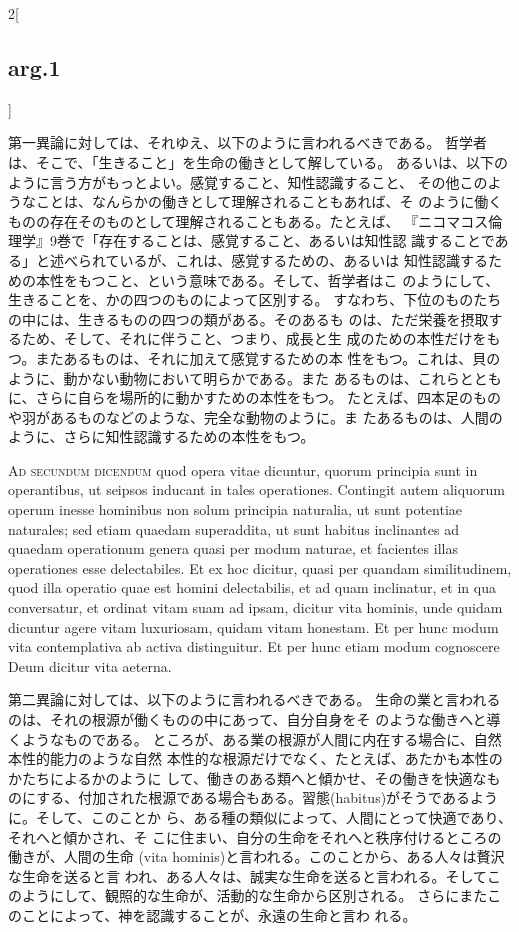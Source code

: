 \documentclass[paper=a4paper,fontsize=10pt,jafontsize=9pt,titlepage]{jlreq}
\begin{document}
\begin{paracol}{2}[\subsection{arg.1}]
\switchcolumn

第一異論に対しては、それゆえ、以下のように言われるべきである。
哲学者は、そこで、「生きること」を生命の働きとして解している。
あるいは、以下のように言う方がもっとよい。感覚すること、知性認識すること、
 その他このようなことは、なんらかの働きとして理解されることもあれば、そ
 のように働くものの存在そのものとして理解されることもある。たとえば、
 『ニコマコス倫理学』9巻で「存在することは、感覚すること、あるいは知性認
 識することである」と述べられているが、これは、感覚するための、あるいは
 知性認識するための本性をもつこと、という意味である。そして、哲学者はこ
 のようにして、生きることを、かの四つのものによって区別する。
すなわち、下位のものたちの中には、生きるものの四つの類がある。そのあるも
 のは、ただ栄養を摂取するため、そして、それに伴うこと、つまり、成長と生
 成のための本性だけをもつ。またあるものは、それに加えて感覚するための本
 性をもつ。これは、貝のように、動かない動物において明らかである。また
 あるものは、これらとともに、さらに自らを場所的に動かすための本性をもつ。
たとえば、四本足のものや羽があるものなどのような、完全な動物のように。ま
 たあるものは、人間のように、さらに知性認識するための本性をもつ。

\switchcolumn*[\subsection{ad.2}]


{\scshape Ad secundum dicendum} quod opera vitae dicuntur, quorum
 principia sunt in operantibus, ut seipsos inducant in tales
 operationes. Contingit autem aliquorum operum inesse hominibus non
 solum principia naturalia, ut sunt potentiae naturales; sed etiam
 quaedam superaddita, ut sunt habitus inclinantes ad quaedam operationum
 genera quasi per modum naturae, et facientes illas operationes esse
 delectabiles. Et ex hoc dicitur, quasi per quandam similitudinem, quod
 illa operatio quae est homini delectabilis, et ad quam inclinatur, et
 in qua conversatur, et ordinat vitam suam ad ipsam, dicitur vita
 hominis, unde quidam dicuntur agere vitam luxuriosam, quidam vitam
 honestam. Et per hunc modum vita contemplativa ab activa
 distinguitur. Et per hunc etiam modum cognoscere Deum dicitur vita
 aeterna.

\switchcolumn

第二異論に対しては、以下のように言われるべきである。
生命の業と言われるのは、それの根源が働くものの中にあって、自分自身をそ
 のような働きへと導くようなものである。
ところが、ある業の根源が人間に内在する場合に、自然本性的能力のような自然
 本性的な根源だけでなく、たとえば、あたかも本性のかたちによるかのように
 して、働きのある類へと傾かせ、その働きを快適なものにする、付加された根源である場合もある。習態(habitus)がそうであるように。そして、このことか
 ら、ある種の類似によって、人間にとって快適であり、それへと傾かされ、そ
 こに住まい、自分の生命をそれへと秩序付けるところの働きが、人間の生命
 (vita hominis)と言われる。このことから、ある人々は贅沢な生命を送ると言
 われ、ある人々は、誠実な生命を送ると言われる。そしてこ
 のようにして、観照的な生命が、活動的な生命から区別される。
 さらにまたこのことによって、神を認識することが、永遠の生命と言わ
 れる。


\end{paracol}
\end{document}
